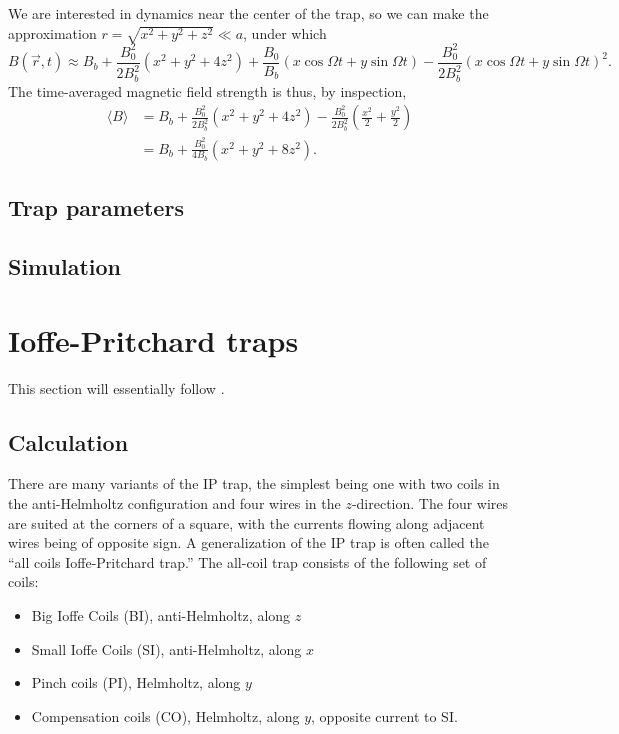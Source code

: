 \documentclass{article}
\theoremstyle{definition}
\newcommand{\f}[2]{\frac{#1}{#2}}
\newcommand{\lp}{\left(}
\newcommand{\rp}{\right)}
\begin{document}
We are interested in dynamics near the center of the trap, so we can make the approximation $r = \sqrt{x^2 + y^2 + z^2} \ll a$, under which 
\begin{equation*}
B(\vec{r},t)\approx B_b + \f{B_0^2}{2B_b^2} (x^2 + y^2 + 4z^2) + \f{B_0}{B_b}(x\cos\Omega t+ y\sin\Omega t) - \f{B_0^2}{2B_b^2}(x\cos\Omega t + y\sin\Omega t)^2.
\end{equation*}
The time-averaged magnetic field strength is thus, by inspection,
\begin{align*}
\langle B \rangle 
&= B_b  + \f{B_0^2}{2B_b^2} (x^2 + y^2 + 4z^2) - \f{B_0^2}{2B_b^2}\lp \f{x^2}{2} + \f{y^2}{2}\rp\\ &= B_b + \f{B_0^2}{4B_b}(x^2 + y^2 + 8z^2).
\end{align*}


\subsection{Trap parameters}

\subsection{Simulation}


\section{Ioffe-Pritchard traps}

This section will essentially follow \cite{allcoil}.


\subsection{Calculation}


There are many variants of the IP trap, the simplest being one with two coils in the anti-Helmholtz configuration and four wires in the $z$-direction. The four wires are suited at the corners of a square, with the currents flowing along adjacent wires being of opposite sign. A generalization of the IP trap is often called the ``all coils Ioffe-Pritchard trap.'' The all-coil trap consists of the following set of coils:
\begin{itemize}
	\item Big Ioffe Coils (BI), anti-Helmholtz, along $z$
	\item Small Ioffe Coils (SI), anti-Helmholtz, along $x$
	\item Pinch coils (PI), Helmholtz, along $y$
	\item Compensation coils (CO), Helmholtz, along $y$, opposite current to SI.
\end{itemize}
\end{document}

